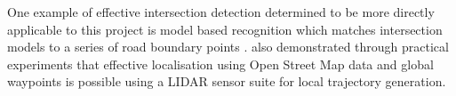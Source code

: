 \documentclass[]{aiaa-tc}%
\begin{document}
One example of effective intersection detection determined to be more directly applicable to this project is model based recognition which matches intersection models to a series of road boundary points \citep{modelBasedIntersection}. \citet{mitLocalNavDriving} also demonstrated through practical experiments that effective localisation using Open Street Map data and global waypoints is possible using a LIDAR sensor suite for local trajectory generation.



%
%
%
%
%
\end{document}
